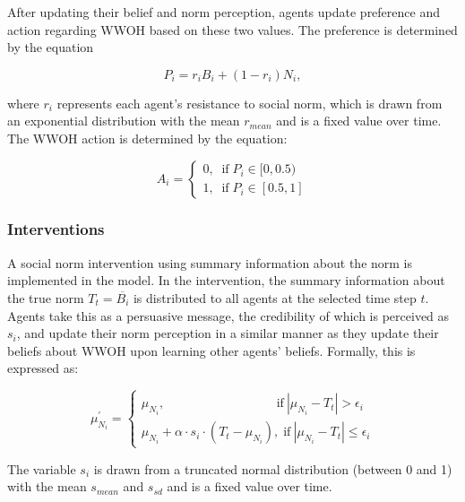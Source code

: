 \documentclass[
  11pt,
]{article}
\begin{document}
After updating their belief and norm perception, agents update
preference and action regarding WWOH based on these two values. The
preference is determined by the equation

\begin{equation}
  P_i = r_i B_i + (1 - r_i) N_i,
\end{equation}

where \(r_i\) represents each agent's resistance to social norm, which
is drawn from an exponential distribution with the mean \(r_{mean}\) and
is a fixed value over time. The WWOH action is determined by the
equation:

\begin{equation}
  A_i = \begin{cases}
    0, \;\; \text{if} \; P_i \in [0, 0.5)\\
    1, \;\; \text{if} \; P_i \in [0.5, 1]
  \end{cases}
\end{equation}

\hypertarget{interventions}{%
\subsubsection{Interventions}\label{interventions}}

A social norm intervention using summary information about the norm is
implemented in the model. In the intervention, the summary information
about the true norm \(T_t = \overline{B_i}\) is distributed to all
agents at the selected time step \(t\). Agents take this as a persuasive
message, the credibility of which is perceived as \(s_i\), and update
their norm perception in a similar manner as they update their beliefs
about WWOH upon learning other agents' beliefs. Formally, this is
expressed as:

\begin{equation}
  \mu_{N_i}^{\prime} = \begin{cases}
    \mu_{N_i}, \;\;\;\;\;\;\;\;\;\;\;\;\;\;\;\;\;\;\;\;\;\;\;\;\;\;\;\;\;\;\;\; \text{if} \: |\mu_{N_i} - T_t| > \epsilon_i \\
    \mu_{N_i} + \alpha \cdot s_i \cdot (T_t - \mu_{N_i}), \; \text{if} \: |\mu_{N_i} - T_t| \le \epsilon_i
  \end{cases}
\end{equation}

The variable \(s_i\) is drawn from a truncated normal distribution
(between 0 and 1) with the mean \(s_{mean}\) and \(s_{sd}\) and is a
fixed value over time.
\end{document}
